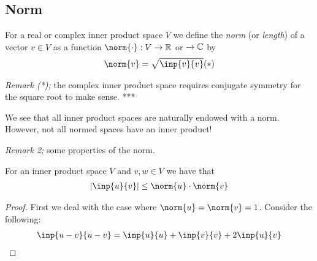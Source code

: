 \subsection{Norm}


\begin{definition}
  For a real or complex inner product space $V$ we define the \emph{norm} (or \emph{length}) of a vector $v\in V$ as a function $\norm{\cdot}:V\to\bbR$ or $\to\mathbb{C}$ by
  \begin{align*}
    \norm{v} = \sqrt{\inp{v}{v}} (*)
  \end{align*}
\end{definition}

\emph{Remark (*);} the complex inner product space requires conjugate symmetry for the square root to make sense. ***


We see that all inner product spaces are naturally endowed with a norm. However, not all normed spaces have an inner product!

\emph{Remark 2;} some properties of the norm.

\begin{theorem}
  For an inner product space $V$ and $v,w\in V$ we have that
  \begin{align*}
    |\inp{u}{v}| \leq \norm{u}\cdot\norm{v}
  \end{align*}
\end{theorem}
\begin{proof}
  First we deal with the case where $\norm{u}=\norm{v}=1$. Consider the following:
  \begin{align*}
    \inp{u-v}{u-v} = \inp{u}{u} + \inp{v}{v} + 2\inp{u}{v}
  \end{align*}
\end{proof}
